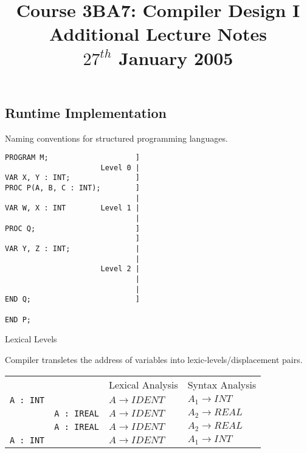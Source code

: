 \documentclass[a4paper,12pt]{article}
\begin{document}
\title{Course 3BA7: Compiler Design I \\ Additional Lecture Notes \\	$27^{th}$ January 2005}

\maketitle

\subsection{Runtime Implementation}

Naming conventions for structured programming languages.

\begin{table}[h]

\begin{verbatim}
PROGRAM M;                    ]
                      Level 0 |
VAR X, Y : INT;               ]
PROC P(A, B, C : INT);        ]
                              |
VAR W, X : INT        Level 1 |
                              |
PROC Q;                       ]
                              ]
VAR Y, Z : INT;               |
                              |
                      Level 2 |
                              |
                              |
END Q;                        ]

END P;

\end{verbatim}

\caption{Lexical Levels}

\end{table}

Compiler transletes the address of variables into
lexic-levels/displacement pairs.

\begin{table}[h]

\begin{tabular}{llll}
					&							&	Lexical Analysis	& Syntax Analysis		\\
\verb!A : INT!	&							&	$A \to IDENT$		&	$A_{1} \to INT$	\\
					&	\verb!A : IREAL!	&	$A \to IDENT$		&	$A_{2} \to REAL$	\\
					&	\verb!A : IREAL!	&	$A \to IDENT$		&	$A_{2} \to REAL$	\\
\verb!A : INT!	&							&	$A \to IDENT$		&	$A_{1} \to INT$	\\
\end{tabular}

\end{table}
\end{document}
